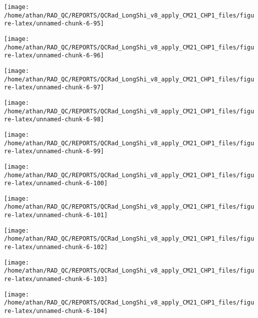 \documentclass[
  10pt,
  a4paper,oneside]{article}
\begin{document}
\begin{center}\texttt{[image: /home/athan/RAD\_QC/REPORTS/QCRad\_LongShi\_v8\_apply\_CM21\_CHP1\_files/figure-latex/unnamed-chunk-6-95]} \end{center}

\begin{center}\texttt{[image: /home/athan/RAD\_QC/REPORTS/QCRad\_LongShi\_v8\_apply\_CM21\_CHP1\_files/figure-latex/unnamed-chunk-6-96]} \end{center}

\begin{center}\texttt{[image: /home/athan/RAD\_QC/REPORTS/QCRad\_LongShi\_v8\_apply\_CM21\_CHP1\_files/figure-latex/unnamed-chunk-6-97]} \end{center}

\begin{center}\texttt{[image: /home/athan/RAD\_QC/REPORTS/QCRad\_LongShi\_v8\_apply\_CM21\_CHP1\_files/figure-latex/unnamed-chunk-6-98]} \end{center}

\begin{center}\texttt{[image: /home/athan/RAD\_QC/REPORTS/QCRad\_LongShi\_v8\_apply\_CM21\_CHP1\_files/figure-latex/unnamed-chunk-6-99]} \end{center}

\begin{center}\texttt{[image: /home/athan/RAD\_QC/REPORTS/QCRad\_LongShi\_v8\_apply\_CM21\_CHP1\_files/figure-latex/unnamed-chunk-6-100]} \end{center}

\begin{center}\texttt{[image: /home/athan/RAD\_QC/REPORTS/QCRad\_LongShi\_v8\_apply\_CM21\_CHP1\_files/figure-latex/unnamed-chunk-6-101]} \end{center}

\begin{center}\texttt{[image: /home/athan/RAD\_QC/REPORTS/QCRad\_LongShi\_v8\_apply\_CM21\_CHP1\_files/figure-latex/unnamed-chunk-6-102]} \end{center}

\begin{center}\texttt{[image: /home/athan/RAD\_QC/REPORTS/QCRad\_LongShi\_v8\_apply\_CM21\_CHP1\_files/figure-latex/unnamed-chunk-6-103]} \end{center}

\begin{center}\texttt{[image: /home/athan/RAD\_QC/REPORTS/QCRad\_LongShi\_v8\_apply\_CM21\_CHP1\_files/figure-latex/unnamed-chunk-6-104]} \end{center}
\end{document}
